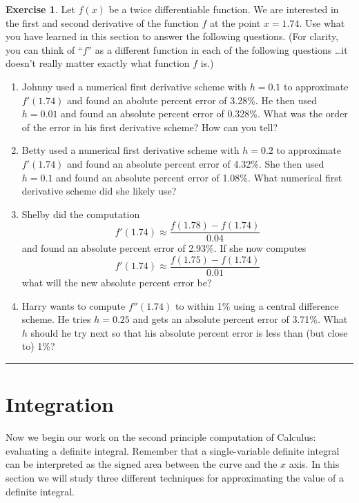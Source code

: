 \documentclass[
]{book}
\theoremstyle{definition}
\theoremstyle{definition}
\theoremstyle{definition}
\newtheorem{exercise}{Exercise}[chapter]
\theoremstyle{remark}
\begin{document}
\begin{exercise}
\protect\hypertarget{exr:unnamed-chunk-170}{}{\label{exr:unnamed-chunk-170} }Let \(f(x)\) be a twice differentiable function. We are interested in the
first and second derivative of the function \(f\) at the point \(x = 1.74\).
Use what you have learned in this section to answer the following
questions. (For clarity, you can think of ``\(f\)'' as a different function
in each of the following questions \ldots it doesn't really matter exactly
what function \(f\) is.)

\begin{enumerate}
\def\labelenumi{\alph{enumi}.}
\item
  Johnny used a numerical first derivative scheme with \(h = 0.1\) to
  approximate \(f'(1.74)\) and found an abolute percent error of 3.28\%.
  He then used \(h=0.01\) and found an absolute percent error of 0.328\%.
  What was the order of the error in his first derivative scheme? How
  can you tell?
\item
  Betty used a numerical first derivative scheme with \(h = 0.2\) to
  approximate \(f'(1.74)\) and found an absolute percent error of 4.32\%.
  She then used \(h=0.1\) and found an absolute percent error of 1.08\%.
  What numerical first derivative scheme did she likely use?
\item
  Shelby did the computation
  \[f'(1.74) \approx \frac{f(1.78) - f(1.74)}{0.04}\] and found an
  absolute percent error of 2.93\%. If she now computes
  \[f'(1.74) \approx \frac{f(1.75) - f(1.74)}{0.01}\] what will the
  new absolute percent error be?
\item
  Harry wants to compute \(f''(1.74)\) to within 1\% using a central
  difference scheme. He tries \(h=0.25\) and gets an absolute percent
  error of 3.71\%. What \(h\) should he try next so that his absolute
  percent error is less than (but close to) 1\%?
\end{enumerate}
\end{exercise}

\begin{center}\rule{0.5\linewidth}{0.5pt}\end{center}

\hypertarget{integration}{%
\section{Integration}\label{integration}}

Now we begin our work on the second principle computation of Calculus: evaluating a definite integral. Remember that a single-variable definite integral can be interpreted as the signed area between the curve and the \(x\) axis. In this section we will study three different techniques for approximating the value of a definite integral.
\end{document}
